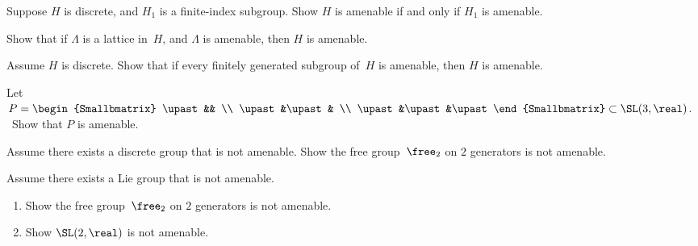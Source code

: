 \begin{exercises}
\item Suppose $H$ is discrete, and $H_1$ is a finite-index subgroup. Show $H$ is amenable if and only if $H_1$ is amenable.

\item Show that if $\Lambda$ is a lattice in~$H$, and $\Lambda$ is amenable, then $H$ is amenable.

\item Assume $H$ is discrete. Show that if every finitely generated subgroup of~$H$ is amenable, then $H$ is amenable.



\item \label{BorelSL3Amen}
Let \ 
	$P = \begin{Smallbmatrix} \upast&& \\ \upast&\upast& \\ \upast&\upast&\upast \end{Smallbmatrix} \subset \SL(3,\real) $. \ 
Show that $P$ is amenable.
\hint{$P$ is solvable.}

\item Assume there exists a discrete group that is not amenable. Show the free group~$\free_2$ on $2$ generators is not amenable.

\item Assume there exists a Lie group that is not amenable. 
\noprelistbreak
	\begin{enumerate}
	\item Show the free group~$\free_2$ on $2$ generators is not amenable.
	\item Show $\SL(2,\real)$ is not amenable.
	\end{enumerate}


\end{exercises}
